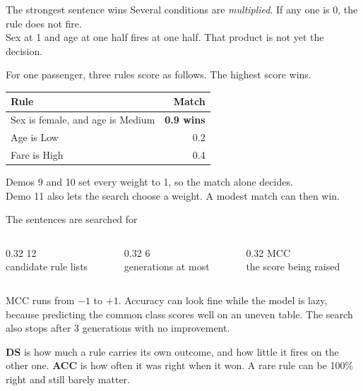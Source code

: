 \documentclass[aspectratio=169,11pt]{beamer}
\begin{document}
\begin{frame}{The strongest sentence wins}
  Several conditions are \emph{multiplied}. If any one is 0, the rule does not fire.\\
  Sex at 1 and age at one half fires at one half. That product is not yet the decision.
  \vspace{0.4em}

  {\small For one passenger, three rules score as follows. The highest score wins.}
  \vspace{0.55em}

  \renewcommand{\arraystretch}{1.25}
  \begin{tabular}{@{}p{} r@{}}
    \toprule
    Rule & Match \\
    \midrule
    Sex is female, and age is Medium & \textcolor{ebdgreen}{\textbf{0.9 wins}} \\
    Age is Low & 0.2 \\
    Fare is High & 0.4 \\
    \bottomrule
  \end{tabular}

  \vspace{0.45em}
  {\small Demos 9 and 10 set every weight to 1, so the match alone decides.\\
  Demo 11 also lets the search choose a weight. A modest match can then win.}
\end{frame}

\begin{frame}{The sentences are searched for}
  \begin{columns}[c]
    \begin{column}{0.32\textwidth}
      \centering
      {\color{ebdnavy}\Huge 12}\\[0.2em]
      {\small candidate rule lists}
    \end{column}
    \begin{column}{0.32\textwidth}
      \centering
      {\color{ebdnavy}\Huge 6}\\[0.2em]
      {\small generations at most}
    \end{column}
    \begin{column}{0.32\textwidth}
      \centering
      {\color{ebdnavy}\Huge MCC}\\[0.2em]
      {\small the score being raised}
    \end{column}
  \end{columns}
  \vspace{0.7em}
  MCC runs from \(-1\) to \(+1\). Accuracy can look fine while the model is lazy, because predicting the common class scores well on an uneven table. The search also stops after 3 generations with no improvement.
  \vspace{0.4em}

  {\small \textbf{DS} is how much a rule carries its own outcome, and how little it fires on the other one. \textbf{ACC} is how often it was right when it won. A rare rule can be 100\% right and still barely matter.}
\end{frame}
\end{document}
